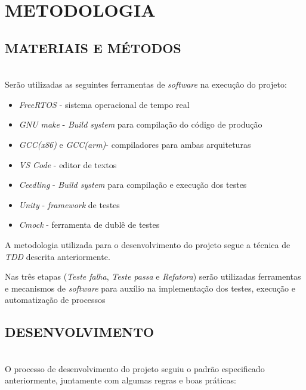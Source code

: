 \documentclass[times, twoside, watermark]{artigo}
\begin{document}
\section{METODOLOGIA}

\subsection{MATERIAIS E MÉTODOS}\hfill\\

Serão utilizadas as seguintes ferramentas de \textit{software} na execução do projeto:

\begin{itemize}
\item \textit{FreeRTOS} - sistema operacional de tempo real
\item \textit{GNU make} - \textit{Build system} para compilação do código de produção
\item \textit{GCC(x86)} e \textit{GCC(arm)}- compiladores para ambas arquiteturas
\item \textit{VS Code} - editor de textos
\item \textit{Ceedling} - \textit{Build system} para compilação e execução dos testes
\item \textit{Unity} - \textit{framework} de testes
\item \textit{Cmock} - ferramenta de dublê de testes
\end{itemize}

A metodologia utilizada para o desenvolvimento do projeto segue a técnica de 
\textit{TDD} descrita anteriormente.

Nas três etapas (\textit{Teste falha}, \textit{Teste passa}
e \textit{Refatora}) serão utilizadas ferramentas e mecanismos de \textit{software} 
para auxílio na implementação dos testes, execução e automatização de processos \hfill\


\subsection{DESENVOLVIMENTO}\hfill\\

O processo de desenvolvimento do projeto seguiu o padrão especificado anteriormente,
juntamente com algumas regras e boas práticas:
\end{document}
